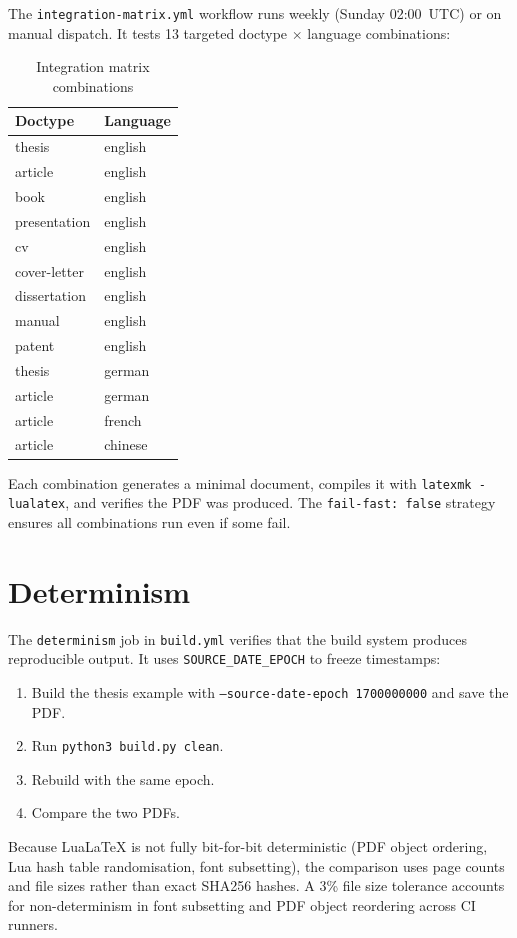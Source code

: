 The \texttt{integration-matrix.yml} workflow runs weekly (Sunday 02:00~UTC)
or on manual dispatch.  It tests 13 targeted doctype $\times$ language
combinations:

\begin{table}[htbp]
  \centering
  \begin{tabular}{@{} l l @{}}
    \toprule
    \textbf{Doctype} & \textbf{Language} \\
    \midrule
    thesis & english \\
    article & english \\
    book & english \\
    presentation & english \\
    cv & english \\
    cover-letter & english \\
    dissertation & english \\
    manual & english \\
    patent & english \\
    thesis & german \\
    article & german \\
    article & french \\
    article & chinese \\
    \bottomrule
  \end{tabular}
  \caption{Integration matrix combinations}
\end{table}

Each combination generates a minimal document, compiles it with
\texttt{latexmk -lualatex}, and verifies the PDF was produced.  The
\texttt{fail-fast: false} strategy ensures all combinations run even if
some fail.

\section{Determinism}

The \texttt{determinism} job in \texttt{build.yml} verifies that the build
system produces reproducible output.  It uses \texttt{SOURCE\_DATE\_EPOCH}
to freeze timestamps:

\begin{enumerate}
  \item Build the thesis example with
        \texttt{--source-date-epoch 1700000000} and save the PDF.
  \item Run \texttt{python3 build.py clean}.
  \item Rebuild with the same epoch.
  \item Compare the two PDFs.
\end{enumerate}

Because LuaLaTeX is not fully bit-for-bit deterministic (PDF object
ordering, Lua hash table randomisation, font subsetting), the comparison
uses page counts and file sizes rather than exact SHA256 hashes.  A 3\%
file size tolerance accounts for non-determinism in font subsetting and
PDF object reordering across CI runners.
